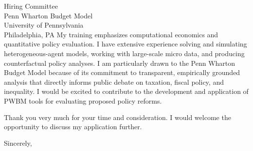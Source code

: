 \documentclass[11pt,letterpaper]{letter}
\begin{document}
\begin{letter}{
Hiring Committee \\
Penn Wharton Budget Model \\
University of Pennsylvania \\
Philadelphia, PA
}
My training emphasizes computational economics and quantitative policy evaluation. I have extensive experience solving and simulating heterogeneous-agent models, working with large-scale micro data, and producing counterfactual policy analyses. I am particularly drawn to the Penn Wharton Budget Model because of its commitment to transparent, empirically grounded analysis that directly informs public debate on taxation, fiscal policy, and inequality. I would be excited to contribute to the development and application of PWBM tools for evaluating proposed policy reforms.

Thank you very much for your time and consideration. I would welcome the opportunity to discuss my application further.

\closing{Sincerely,}

\end{letter}
\end{document}

